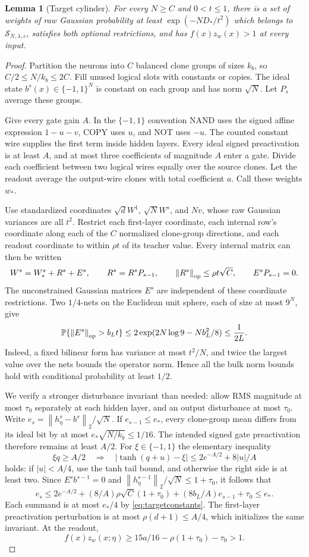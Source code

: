 \documentclass[11pt]{article}
\newtheorem{lemma}[theorem]{Lemma}
\newcommand{\Prb}{\mathbb P}
\newcommand{\norm}[1]{\left\|#1\right\|}
\begin{document}
\begin{lemma}[Target cylinder]\label{lem:cylinder}
For every $N\ge C$ and $0<t\le1$, there is a set of weights of raw Gaussian
probability at least $\exp(-ND_*/t^2)$ which belongs to
$\mathcal S_{N,\lambda,c}$, satisfies both optional restrictions, and has
$f(x)z_w(x)>1$ at every input.
\end{lemma}
\begin{proof}
Partition the neurons into $C$ balanced clone groups of sizes $k_b$, so
$C/2\le N/k_b\le2C$. Fill unused logical slots with constants or copies.
The ideal state $b^s(x)\in\{-1,1\}^N$ is constant on each group and has
norm $\sqrt N$. Let $P_s$ average these groups.

Give every gate gain $A$. In the $\{-1,1\}$ convention NAND uses the
signed affine expression $1-u-v$, COPY uses $u$, and NOT uses $-u$.
The counted constant wire supplies the first term inside hidden layers.
Every ideal signed preactivation is at least $A$, and at most three
coefficients of magnitude $A$ enter a gate. Divide each coefficient
between two logical wires equally over the source clones. Let the readout
average the output-wire clones with total coefficient $a$. Call these
weights $w_*$.

Use standardized coordinates $\sqrt d W^1$, $\sqrt N W^s$, and $Nv$,
whose raw Gaussian variances are all $t^2$. Restrict each first-layer
coordinate, each internal row's coordinate along each of the $C$
normalized clone-group directions, and each readout coordinate to within
$\rho t$ of its teacher value. Every internal matrix can then be written
\[
 W^s=W_*^s+R^s+E^s,\qquad R^s=R^sP_{s-1},\qquad
 \norm{R^s}_{\rm op}\le\rho t\sqrt C,\qquad E^sP_{s-1}=0.
\]
The unconstrained Gaussian matrices $E^s$ are independent of these
coordinate restrictions. Two $1/4$-nets on the Euclidean unit sphere,
each of size at most $9^N$, give
\[
 \Prb\{\norm{E^s}_{\rm op}>b_Lt\}
 \le2\exp(2N\log9-Nb_L^2/8)\le\frac1{2L}.
\]
Indeed, a fixed bilinear form has variance at most $t^2/N$, and twice the
largest value over the nets bounds the operator norm. Hence all the bulk
norm bounds hold with conditional probability at least $1/2$.

We verify a stronger disturbance invariant than needed: allow RMS
magnitude at most $\tau_0$ separately at each hidden layer, and an output
disturbance at most $\tau_0$. Write
$e_s=\norm{h^s_\eta-b^s}_2/\sqrt N$. If $e_{s-1}\le e_*$, every
clone-group mean differs from its ideal bit by at most
$e_*\sqrt{N/k_b}\le1/16$. The intended signed gate preactivation
therefore remains at least $A/2$.
For $\xi\in\{-1,1\}$ the elementary inequality
\[
 \xi q\ge A/2\quad\Longrightarrow\quad
 |\tanh(q+u)-\xi|\le2e^{-A/2}+8|u|/A
\]
holds: if $|u|<A/4$, use the tanh tail bound, and otherwise the right side
is at least two. Since $E^sb^{s-1}=0$ and
$\norm{h^{s-1}_\eta}_2/\sqrt N\le1+\tau_0$, it follows that
\[
 e_s\le2e^{-A/2}+(8/A)\rho\sqrt C(1+\tau_0)
                  +(8b_L/A)e_{s-1}+\tau_0\le e_*.
\]
Each summand is at most $e_*/4$ by \eqref{eq:targetconstants}.
The first-layer preactivation perturbation is at most
$\rho(d+1)\le A/4$, which initializes the same invariant. At the readout,
\[
 f(x)z_w(x;\eta)\ge15a/16-\rho(1+\tau_0)-\tau_0>1.
\]


\end{proof}
\end{document}
